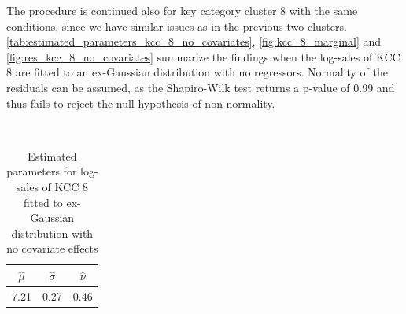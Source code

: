 
The procedure is continued also for key category cluster 8 with the same conditions, since we have similar issues as in the previous two clusters.
\\

\autoref{tab:estimated_parameters_kcc_8_no_covariates}, \autoref{fig:kcc_8_marginal} and \autoref{fig:res_kcc_8_no_covariates} summarize the findings when the log-sales of \ac{KCC} 8 are fitted to an ex-Gaussian distribution with no regressors. Normality of the residuals can be assumed, as the Shapiro-Wilk test returns a p-value of 0.99 and thus fails to reject the null hypothesis of non-normality.
\\



\begin{table}[H]
\setlength\arrayrulewidth{1pt}  
\centering
\begin{adjustbox}{max width=\textwidth}\
\begin{tabular}{|c|c|c|}
\hline
\rowcolor{lightgray} 
$\hat{\mu}$ & $\hat{\sigma}$ & $\hat{\nu}$ \\ \hline
7.21        & 0.27           & 0.46        \\ \hline
\end{tabular}
\end{adjustbox}
\caption{Estimated parameters for log-sales of KCC 8 fitted to ex-Gaussian distribution with no covariate effects}
\label{tab:estimated_parameters_kcc_8_no_covariates}
\end{table}



